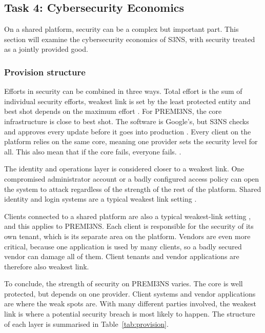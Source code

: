 \subsection{Task 4: Cybersecurity Economics}
\label{sec:task4}

On a shared platform, security can be a complex but important part. This section will examine the cybersecurity economics of S3NS, with security treated as a jointly provided good. 

\subsubsection{Provision structure}

Efforts in security can be combined in three ways. Total effort is the sum
of individual security efforts, weakest link is set by the least protected
entity and best shot depends on the maximum effort \parencite[p.~1]{varian2004}. For PREMI3NS, the core infrastructure is
close to best shot. The software is Google's, but S3NS checks and approves every update before it
goes into production \parencite{s3ns2025premi3ns}. Every client on the platform relies on the same core, meaning one provider sets the security level for all. This also mean that if the core fails, everyone fails. \parencite[slide 23]{kianpour2026slides}.

The identity and operations layer is considered closer to a weakest link. One compromised administrator account or a badly configured access policy can open the system to attack regardless of the strength of the rest of the platform. Shared identity and login systems are a typical weakest link setting \parencite[slide 21]{kianpour2026slides}.

Clients connected to a shared platform are also a typical
weakest-link setting \parencite[slide 21]{kianpour2026slides}, and this
applies to PREMI3NS. Each client is responsible for the security of its own
tenant, which is its separate area on the platform. Vendors are even more
critical, because one application is used by many clients, so a badly secured
vendor can damage all of them. Client tenants and vendor applications are
therefore also weakest link.

To conclude, the strength of security on PREMI3NS varies. The core is well protected, but depends on one provider. Client systems
and vendor applications are where the weak spots are. With many different
parties involved, the weakest link is where a potential security breach is
most likely to happen. The structure of each layer is summarised in Table~\ref{tab:provision}. 

